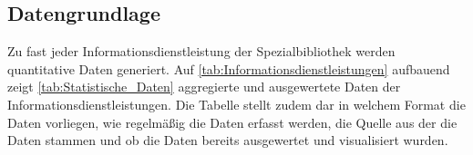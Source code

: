\subsection{Datengrundlage}

Zu fast jeder Informationsdienstleistung der Spezialbibliothek werden quantitative Daten generiert. 
Auf \autoref{tab:Informationsdienstleistungen} aufbauend zeigt \autoref{tab:Statistische_Daten} aggregierte und
ausgewertete Daten der Informationsdienstleistungen. Die Tabelle stellt zudem dar in welchem Format die Daten vorliegen, 
wie regelmäßig die Daten erfasst werden, die Quelle aus der die Daten stammen und ob die Daten bereits ausgewertet und visualisiert wurden.


\begingroup
\setlength{\tabcolsep}{4pt} %
\renewcommand{\arraystretch}{1.5}
